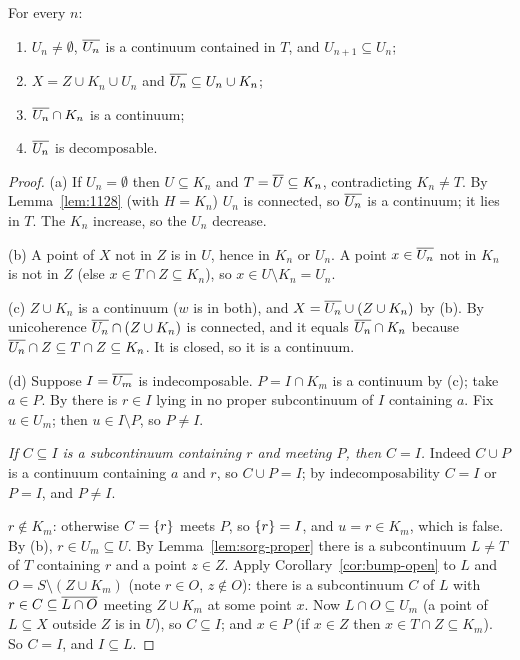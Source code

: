 \begin{lemma}\label{lem:sorg-facts}
For every $n$:
\begin{enumerate}[label=(\alph*)]
\item $U_n\ne\emptyset$, $\overline{U_n}$ is a continuum contained in $T$, and $U_{n+1}\subseteq U_n$;
\item $X=Z\cup K_n\cup U_n$ and $\overline{U_n}\subseteq U_n\cup K_n$;
\item $\overline{U_n}\cap K_n$ is a continuum;
\item $\overline{U_n}$ is decomposable.
\end{enumerate}
\end{lemma}

\begin{proof}
(a) If $U_n=\emptyset$ then $U\subseteq K_n$ and $T=\overline{U}\subseteq K_n$, contradicting $K_n\ne T$. By
Lemma~\ref{lem:1128} (with $H=K_n$) $U_n$ is connected, so $\overline{U_n}$ is a continuum; it lies in
$T$. The $K_n$ increase, so the $U_n$ decrease.

(b) A point of $X$ not in $Z$ is in $U$, hence in $K_n$ or $U_n$. A point $x\in\overline{U_n}$ not in $K_n$ is
not in $Z$ (else $x\in T\cap Z\subseteq K_n$), so $x\in U\setminus K_n=U_n$.

(c) $Z\cup K_n$ is a continuum ($w$ is in both), and $X=\overline{U_n}\cup(Z\cup K_n)$ by (b). By
unicoherence $\overline{U_n}\cap(Z\cup K_n)$ is connected, and it equals $\overline{U_n}\cap K_n$ because
$\overline{U_n}\cap Z\subseteq T\cap Z\subseteq K_n$. It is closed, so it is a continuum.

(d) Suppose $I=\overline{U_m}$ is indecomposable. $P=I\cap K_m$ is a continuum by (c); take $a\in P$. By
 there is $r\in I$ lying in no proper subcontinuum of $I$ containing $a$. Fix $u\in
U_m$; then $u\in I\setminus P$, so $P\ne I$.

\emph{If $C\subseteq I$ is a subcontinuum containing $r$ and meeting $P$, then $C=I$.} Indeed $C\cup P$ is a
continuum containing $a$ and $r$, so $C\cup P=I$; by indecomposability $C=I$ or $P=I$, and $P\neq I$.

\emph{$r\notin K_m$}: otherwise $C=\left\{ r \right\}$ meets $P$, so $\left\{ r \right\}=I$, and $u=r\in K_m$, which is false.
By (b), $r\in U_m\subseteq U$. By Lemma~\ref{lem:sorg-proper} there is a subcontinuum $L\ne T$ of $T$
containing $r$ and a point $z\in Z$. Apply Corollary~\ref{cor:bump-open} to $L$ and $O=S\setminus(Z\cup
K_m)$ (note $r\in O$, $z\notin O$): there is a subcontinuum $C$ of $L$ with $r\in C\subseteq\overline{L\cap O}$
meeting $Z\cup K_m$ at some point $x$. Now $L\cap O\subseteq U_m$ (a point of $L\subseteq X$ outside $Z$ is
in $U$), so $C\subseteq I$; and $x\in P$ (if $x\in Z$ then $x\in T\cap Z\subseteq K_m$). So $C=I$, and
$I\subseteq L$.


\end{proof}
